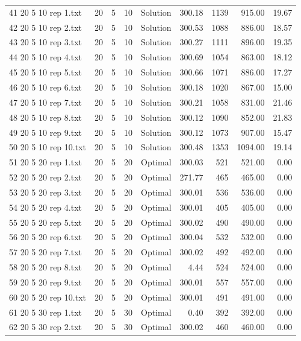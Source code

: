 \begin{longtable}{lrrllrrrr}
41 20 5 10 rep 1.txt & 20 & 5 & 10 & Solution & 300.18 & 1139 & 915.00 & 19.67\\
42 20 5 10 rep 2.txt & 20 & 5 & 10 & Solution & 300.53 & 1088 & 886.00 & 18.57\\
43 20 5 10 rep 3.txt & 20 & 5 & 10 & Solution & 300.27 & 1111 & 896.00 & 19.35\\
44 20 5 10 rep 4.txt & 20 & 5 & 10 & Solution & 300.69 & 1054 & 863.00 & 18.12\\
45 20 5 10 rep 5.txt & 20 & 5 & 10 & Solution & 300.66 & 1071 & 886.00 & 17.27\\
46 20 5 10 rep 6.txt & 20 & 5 & 10 & Solution & 300.18 & 1020 & 867.00 & 15.00\\
47 20 5 10 rep 7.txt & 20 & 5 & 10 & Solution & 300.21 & 1058 & 831.00 & 21.46\\
48 20 5 10 rep 8.txt & 20 & 5 & 10 & Solution & 300.12 & 1090 & 852.00 & 21.83\\
49 20 5 10 rep 9.txt & 20 & 5 & 10 & Solution & 300.12 & 1073 & 907.00 & 15.47\\
50 20 5 10 rep 10.txt & 20 & 5 & 10 & Solution & 300.48 & 1353 & 1094.00 & 19.14\\
51 20 5 20 rep 1.txt & 20 & 5 & 20 & Optimal & 300.03 & 521 & 521.00 &  0.00\\
52 20 5 20 rep 2.txt & 20 & 5 & 20 & Optimal & 271.77 & 465 & 465.00 &  0.00\\
53 20 5 20 rep 3.txt & 20 & 5 & 20 & Optimal & 300.01 & 536 & 536.00 &  0.00\\
54 20 5 20 rep 4.txt & 20 & 5 & 20 & Optimal & 300.01 & 405 & 405.00 &  0.00\\
55 20 5 20 rep 5.txt & 20 & 5 & 20 & Optimal & 300.02 & 490 & 490.00 &  0.00\\
56 20 5 20 rep 6.txt & 20 & 5 & 20 & Optimal & 300.04 & 532 & 532.00 &  0.00\\
57 20 5 20 rep 7.txt & 20 & 5 & 20 & Optimal & 300.02 & 492 & 492.00 &  0.00\\
58 20 5 20 rep 8.txt & 20 & 5 & 20 & Optimal &  4.44 & 524 & 524.00 &  0.00\\
59 20 5 20 rep 9.txt & 20 & 5 & 20 & Optimal & 300.01 & 557 & 557.00 &  0.00\\
60 20 5 20 rep 10.txt & 20 & 5 & 20 & Optimal & 300.01 & 491 & 491.00 &  0.00\\
61 20 5 30 rep 1.txt & 20 & 5 & 30 & Optimal &  0.40 & 392 & 392.00 &  0.00\\
62 20 5 30 rep 2.txt & 20 & 5 & 30 & Optimal & 300.02 & 460 & 460.00 &  0.00\\

\end{longtable}
